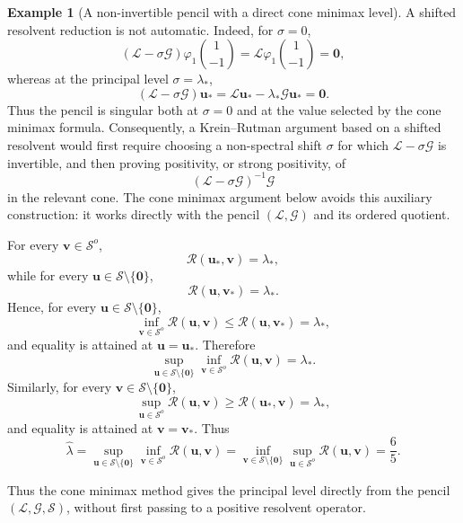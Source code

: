 \documentclass[preprint,10pt]{elsarticle}
\theoremstyle{plain}
\theoremstyle{definition}
\newtheorem{example}{Example}
\theoremstyle{remark}
\begin{document}
\begin{example}[A non-invertible pencil with a direct cone minimax level]
	A shifted resolvent reduction is not automatic. Indeed, for \(\sigma=0\),
	\[
	(\mathcal L-\sigma\mathcal G)\varphi_1\binom{1}{-1}
	=
	\mathcal L\varphi_1\binom{1}{-1}
	=
	\mathbf0,
	\]
	whereas at the principal level \(\sigma=\lambda_*\),
	\[
	(\mathcal L-\sigma\mathcal G)\mathbf u_*
	=
	\mathcal L\mathbf u_*-\lambda_*\mathcal G\mathbf u_*
	=
	\mathbf0 .
	\]
	Thus the pencil is singular both at \(\sigma=0\) and at the value
	selected by the cone minimax formula. Consequently, a Krein--Rutman
	argument based on a shifted resolvent would first require choosing a
	non-spectral shift \(\sigma\) for which \(\mathcal L-\sigma\mathcal G\)
	is invertible, and then proving positivity, or strong positivity, of
	\[
	(\mathcal L-\sigma\mathcal G)^{-1}\mathcal G
	\]
	in the relevant cone. The cone minimax argument below avoids this
	auxiliary construction: it works directly with the pencil
	\((\mathcal L,\mathcal G)\) and its ordered quotient.
	
	For every \(\mathbf v\in\mathcal S^o\),
	\[
	\mathcal R(\mathbf u_*,\mathbf v)=\lambda_*,
	\]
	while for every \(\mathbf u\in\mathcal S\setminus\{\mathbf0\}\),
	\[
	\mathcal R(\mathbf u,\mathbf v_*)=\lambda_* .
	\]
	Hence, for every \(\mathbf u\in\mathcal S\setminus\{\mathbf0\}\),
	\[
	\inf_{\mathbf v\in\mathcal S^o}\mathcal R(\mathbf u,\mathbf v)
	\le
	\mathcal R(\mathbf u,\mathbf v_*)
	=
	\lambda_*,
	\]
	and equality is attained at \(\mathbf u=\mathbf u_*\). Therefore
	\[
	\sup_{\mathbf u\in\mathcal S\setminus\{\mathbf0\}}
	\inf_{\mathbf v\in\mathcal S^o}
	\mathcal R(\mathbf u,\mathbf v)
	=
	\lambda_* .
	\]
	Similarly, for every \(\mathbf v\in\mathcal S\setminus\{\mathbf0\}\),
	\[
	\sup_{\mathbf u\in\mathcal S^o}\mathcal R(\mathbf u,\mathbf v)
	\ge
	\mathcal R(\mathbf u_*,\mathbf v)
	=
	\lambda_*,
	\]
	and equality is attained at \(\mathbf v=\mathbf v_*\). Thus
	\[
	\hat\lambda
	=
	\sup_{\mathbf u\in\mathcal S\setminus\{\mathbf0\}}
	\inf_{\mathbf v\in\mathcal S^o}
	\mathcal R(\mathbf u,\mathbf v)
	=
	\inf_{\mathbf v\in\mathcal S\setminus\{\mathbf0\}}
	\sup_{\mathbf u\in\mathcal S^o}
	\mathcal R(\mathbf u,\mathbf v)
	=
	\frac65 .
	\]
	
	Thus the cone minimax method gives the principal level directly from the
	pencil \((\mathcal L,\mathcal G,\mathcal S)\), without first passing to a
	positive resolvent operator.
\end{example}
\end{document}
